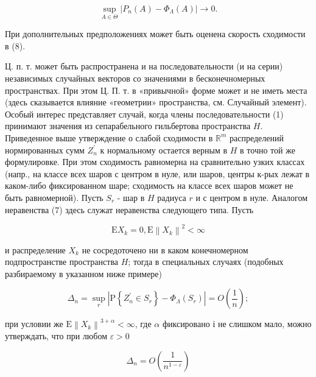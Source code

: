 \documentclass[10pt]{article}
\begin{document}
\[

\sup _{A \in \Theta}\left|P_{n}(A)-\Phi_{\Lambda}(A)\right| \rightarrow 0 .

\]



При дополнительных предположениях может быть оценена скорость сходимости в (8).



Ц. п. т. может быть распространена и на последовательности (и на серии) независимых случайных векторов со значениями в бесконечномерных пространствах. При этом Ц. П. т. в «привычной» форме может и не иметь места (здесь сказывается влияние «геометрии» пространства, см. Случайный элемент). Особый интерес представляет случай, когда члены последовательности (1) принимают значения из сепарабельного гильбертова пространства $H$. Приведенное выше утверждение о слабой сходимости в $\mathbb{R}^{m}$ распределений нормированных сумм $Z_{n}^{\prime}$ к нормальному остается верным в $H$ в точно той же формулировке. При этом сходимость равномерна на сравнительно узких классах (напр., на классе всех шаров с центром в нуле, или шаров, центры к-рых лежат в каком-либо фиксированном шаре; сходимость на классе всех шаров может не быть равномерной). Пусть $S_{r}$ - шар в $H$ радиуса $r$ и с центром в нуле. Аналогом неравенства (7) здесь служат неравенства следующего типа. Пусть



\[

\mathrm{E} X_{k}=0, \mathrm{E}\left\|X_{k}\right\|^{2}<\infty

\]



и распределение $X_{k}$ не сосредоточено ни в каком конечномерном подпространстве пространства $H$; тогда в специальных случаях (подобных разбираемому в указанном ниже примере)



\[

\Delta_{n}=\sup _{r}\left|\mathrm{P}\left\{Z_{n}^{\prime} \in S_{r}\right\}-\Phi_{\Lambda}\left(S_{r}\right)\right|=O\left(\frac{1}{n}\right) ;

\]



при условии же $\mathrm{E}\left\|X_{k}\right\|^{3+\alpha}<\infty$, где $\alpha$ фиксировано і не слишком мало, можно утверждать, что при любом $\varepsilon>0$



\[

\Delta_{n}=O\left(\frac{1}{n^{1-\varepsilon}}\right)

\]
\end{document}
